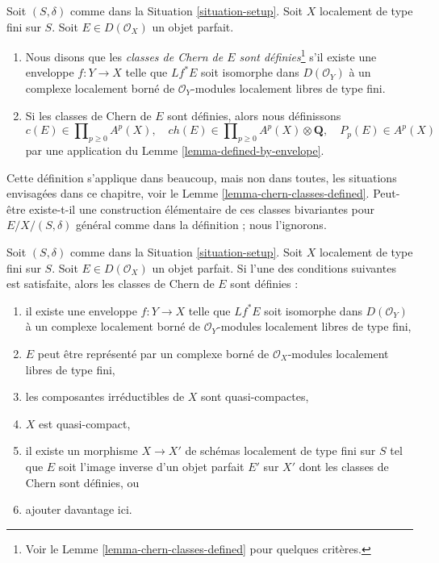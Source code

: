 \begin{definition}
\label{definition-defined-on-perfect}
Soit $(S, \delta)$ comme dans la Situation \ref{situation-setup}.
Soit $X$ localement de type fini sur $S$. Soit $E \in D(\mathcal{O}_X)$
un objet parfait.
\begin{enumerate}
\item Nous disons que les {\it classes de Chern de $E$ sont définies}\footnote{Voir le
Lemme \ref{lemma-chern-classes-defined} pour quelques critères.} s'il existe
une enveloppe $f : Y \to X$ telle que $Lf^*E$ soit isomorphe dans
$D(\mathcal{O}_Y)$ à un complexe localement borné de
$\mathcal{O}_Y$-modules localement libres de type fini.
\item Si les classes de Chern de $E$ sont définies, alors nous définissons
$$
c(E) \in \prod\nolimits_{p \geq 0} A^p(X),\quad
ch(E) \in
\prod\nolimits_{p \geq 0} A^p(X) \otimes \mathbf{Q},\quad
P_p(E) \in A^p(X)
$$
par une application du Lemme \ref{lemma-defined-by-envelope}.
\end{enumerate}
\end{definition}

\noindent
Cette définition s'applique dans beaucoup, mais non dans toutes, les situations envisagées
dans ce chapitre, voir le Lemme \ref{lemma-chern-classes-defined}.
Peut-être existe-t-il une construction élémentaire de ces classes bivariantes pour
$E/X/(S,\delta)$ général comme dans la définition ; nous l'ignorons.

\begin{lemma}
\label{lemma-chern-classes-defined}
Soit $(S, \delta)$ comme dans la Situation \ref{situation-setup}.
Soit $X$ localement de type fini sur $S$. Soit $E \in D(\mathcal{O}_X)$
un objet parfait. Si l'une des conditions suivantes est satisfaite, alors
les classes de Chern de $E$ sont définies :
\begin{enumerate}
\item il existe une enveloppe $f : Y \to X$ telle que $Lf^*E$
soit isomorphe dans $D(\mathcal{O}_Y)$ à un complexe localement borné de
$\mathcal{O}_Y$-modules localement libres de type fini,
\item $E$ peut être représenté par un complexe borné de
$\mathcal{O}_X$-modules localement libres de type fini,
\item les composantes irréductibles de $X$ sont quasi-compactes,
\item $X$ est quasi-compact,
\item il existe un morphisme $X \to X'$ de schémas localement de type fini
sur $S$ tel que $E$ soit l'image inverse d'un objet parfait $E'$ sur $X'$
dont les classes de Chern sont définies, ou
\item ajouter davantage ici.
\end{enumerate}
\end{lemma}

